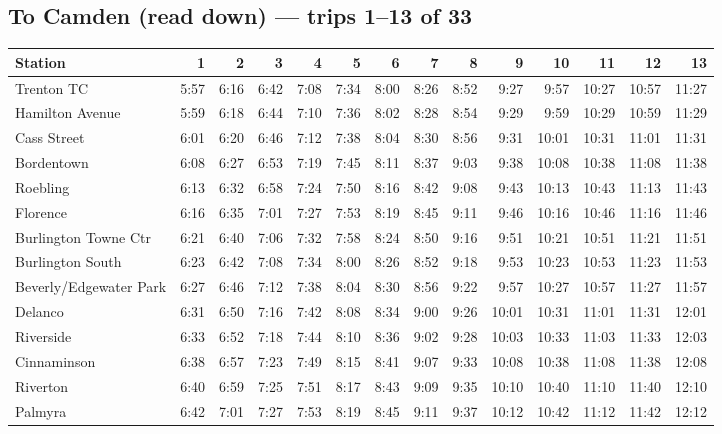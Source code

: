 \subsection*{To Camden (read down) --- trips 1--13 of 33}
\begin{center}\footnotesize\setlength{\tabcolsep}{3pt}\begin{tabular}{@{}lrrrrrrrrrrrrr@{}}\toprule
Station & 1 & 2 & 3 & 4 & 5 & 6 & 7 & 8 & 9 & 10 & 11 & 12 & 13 \\\midrule
Trenton TC & 5:57 & 6:16 & 6:42 & 7:08 & 7:34 & 8:00 & 8:26 & 8:52 & 9:27 & 9:57 & 10:27 & 10:57 & 11:27 \\
Hamilton Avenue & 5:59 & 6:18 & 6:44 & 7:10 & 7:36 & 8:02 & 8:28 & 8:54 & 9:29 & 9:59 & 10:29 & 10:59 & 11:29 \\
Cass Street & 6:01 & 6:20 & 6:46 & 7:12 & 7:38 & 8:04 & 8:30 & 8:56 & 9:31 & 10:01 & 10:31 & 11:01 & 11:31 \\
Bordentown & 6:08 & 6:27 & 6:53 & 7:19 & 7:45 & 8:11 & 8:37 & 9:03 & 9:38 & 10:08 & 10:38 & 11:08 & 11:38 \\
Roebling & 6:13 & 6:32 & 6:58 & 7:24 & 7:50 & 8:16 & 8:42 & 9:08 & 9:43 & 10:13 & 10:43 & 11:13 & 11:43 \\
Florence & 6:16 & 6:35 & 7:01 & 7:27 & 7:53 & 8:19 & 8:45 & 9:11 & 9:46 & 10:16 & 10:46 & 11:16 & 11:46 \\
Burlington Towne Ctr & 6:21 & 6:40 & 7:06 & 7:32 & 7:58 & 8:24 & 8:50 & 9:16 & 9:51 & 10:21 & 10:51 & 11:21 & 11:51 \\
Burlington South & 6:23 & 6:42 & 7:08 & 7:34 & 8:00 & 8:26 & 8:52 & 9:18 & 9:53 & 10:23 & 10:53 & 11:23 & 11:53 \\
Beverly/Edgewater Park & 6:27 & 6:46 & 7:12 & 7:38 & 8:04 & 8:30 & 8:56 & 9:22 & 9:57 & 10:27 & 10:57 & 11:27 & 11:57 \\
Delanco & 6:31 & 6:50 & 7:16 & 7:42 & 8:08 & 8:34 & 9:00 & 9:26 & 10:01 & 10:31 & 11:01 & 11:31 & 12:01 \\
Riverside & 6:33 & 6:52 & 7:18 & 7:44 & 8:10 & 8:36 & 9:02 & 9:28 & 10:03 & 10:33 & 11:03 & 11:33 & 12:03 \\
Cinnaminson & 6:38 & 6:57 & 7:23 & 7:49 & 8:15 & 8:41 & 9:07 & 9:33 & 10:08 & 10:38 & 11:08 & 11:38 & 12:08 \\
Riverton & 6:40 & 6:59 & 7:25 & 7:51 & 8:17 & 8:43 & 9:09 & 9:35 & 10:10 & 10:40 & 11:10 & 11:40 & 12:10 \\
Palmyra & 6:42 & 7:01 & 7:27 & 7:53 & 8:19 & 8:45 & 9:11 & 9:37 & 10:12 & 10:42 & 11:12 & 11:42 & 12:12 \\

\end{tabular}
\end{center}

